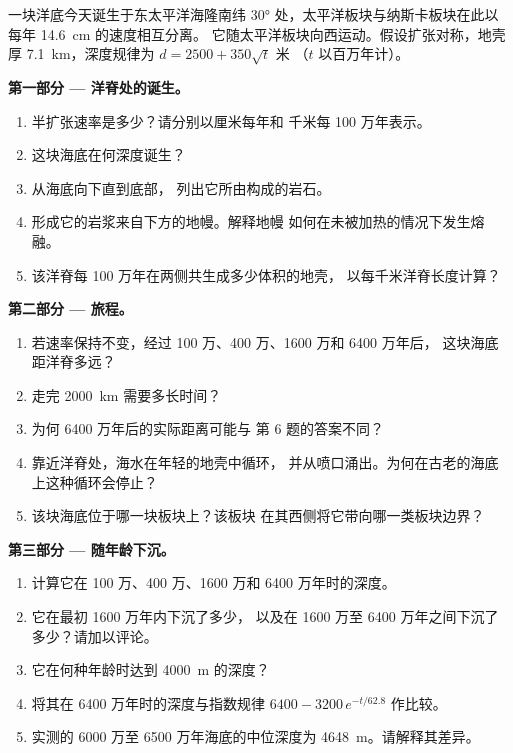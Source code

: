 \begin{problem}
\label{pb:g11:ocean-ridges:1}
一块洋底今天诞生于东太平洋海隆南纬 \ang{30}
处，太平洋板块与纳斯卡板块在此以每年 \qty{14.6}{cm} 的速度相互分离。
它随太平洋板块向西运动。假设扩张对称，地壳
厚 \qty{7.1}{km}，深度规律为 $d = 2500 + 350\sqrt{t}$ 米
（$t$ 以百万年计）。

\medskip
\noindent\textbf{第一部分 --- 洋脊处的诞生。}
\begin{enumerate}
  \item 半扩张速率是多少？请分别以厘米每年和
        千米每 100 万年表示。
  \item 这块海底在何深度诞生？
  \item 从海底向下直到底部，
        列出它所由构成的岩石。
  \item 形成它的岩浆来自下方的地幔。解释地幔
        如何在未被加热的情况下发生熔融。
  \item 该洋脊每 100 万年在两侧共生成多少体积的地壳，
        以每千米洋脊长度计算？
\end{enumerate}

\medskip
\noindent\textbf{第二部分 --- 旅程。}
\begin{enumerate}[resume]
  \item 若速率保持不变，经过 100 万、400 万、1600 万和 6400 万年后，
        这块海底距洋脊多远？
  \item 走完 \qty{2000}{km} 需要多长时间？
  \item 为何 6400 万年后的实际距离可能与
        第 6 题的答案不同？
  \item 靠近洋脊处，海水在年轻的地壳中循环，
        并从喷口涌出。为何在古老的海底上这种循环会停止？
  \item 该块海底位于哪一块板块上？该板块
        在其西侧将它带向哪一类板块边界？
\end{enumerate}

\medskip
\noindent\textbf{第三部分 --- 随年龄下沉。}
\begin{enumerate}[resume]
  \item 计算它在 100 万、400 万、1600 万和 6400 万年时的深度。
  \item 它在最初 1600 万年内下沉了多少，
        以及在 1600 万至 6400 万年之间下沉了多少？请加以评论。
  \item 它在何种年龄时达到 \qty{4000}{m} 的深度？
  \item 将其在 6400 万年时的深度与指数规律
        $6400 - 3200\,e^{-t/62.8}$ 作比较。
  \item 实测的 6000 万至 6500 万年海底的中位深度为
        \qty{4648}{m}。请解释其差异。
\end{enumerate}


\end{problem}
